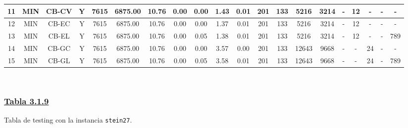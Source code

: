 {\begin{tabular}{ *{19}{c|} c }
\hline
11 & MIN & CB-CV & Y & 7615 & 6875.00 & 10.76 & 0.00 & 0.00 & 1.43 & 0.01 & 201 & 133 & 5216 & 3214 & - & 12 & - & - & -\\
\hline
12 & MIN & CB-EC & Y & 7615 & 6875.00 & 10.76 & 0.00 & 0.00 & 1.37 & 0.01 & 201 & 133 & 5216 & 3214 & - & 12 & - & - & -\\
\hline
13 & MIN & CB-EL & Y & 7615 & 6875.00 & 10.76 & 0.00 & 0.05 & 1.38 & 0.01 & 201 & 133 & 5216 & 3214 & - & 12 & - & - & 789\\
\hline
14 & MIN & CB-GC & Y & 7615 & 6875.00 & 10.76 & 0.00 & 0.00 & 3.57 & 0.00 & 201 & 133 & 12643 & 9668 & - & - & 24 & - & -\\
\hline
15 & MIN & CB-GL & Y & 7615 & 6875.00 & 10.76 & 0.00 & 0.05 & 3.58 & 0.01 & 201 & 133 & 12643 & 9668 & - & - & 24 & - & 789\\
\hline
\end{tabular}\\
\vspace{4mm}
}

\subsubsection*{\underline{Tabla 3.1.9}}
\noindent Tabla de testing con la instancia \verb_stein27_.\\

